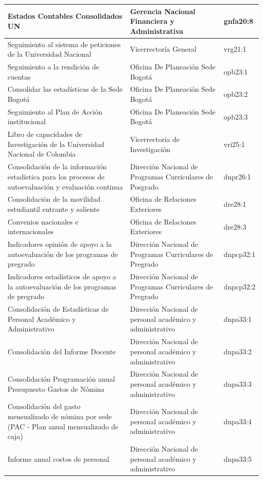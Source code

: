 \documentclass[
]{book}
\begin{document}
\begin{table}
\begin{tabular}[t]{l|l|l}
\hline
Estados Contables Consolidados UN & Gerencia Nacional Financiera y Administrativa & gnfa20:8\\
\hline
Seguimiento al sistema de peticiones de la Universidad Nacional & Vicerrectoría General & vrg21:1\\
\hline
Seguimiento a la rendición de cuentas & Oficina De Planeación Sede Bogotá & opb23:1\\
\hline
Consolidar las estadísticas de la Sede Bogotá & Oficina De Planeación Sede Bogotá & opb23:2\\
\hline
Seguimiento al Plan de Acción institucional & Oficina De Planeación Sede Bogotá & opb23:3\\
\hline
Libro de capacidades de Investigación de la Universidad Nacional de Colombia & Vicerrectoría de Investigación & vri25:1\\
\hline
Consolidación de la información estadística para los procesos de autoevaluación y evaluación continua & Dirección Nacional de Programas Curriculares de Posgrado & dnpr26:1\\
\hline
Consolidación de la movilidad estudiantil entrante y saliente & Oficina de Relaciones Exteriores & dre28:1\\
\hline
Convenios nacionales e internacionales & Oficina de Relaciones Exteriores & dre28:3\\
\hline
Indicadores opinión de apoyo a la autoevaluación de los programas de pregrado & Dirección Nacional de Programas Curriculares de Pregrado & dnpcp32:1\\
\hline
Indicadores estadísticos de apoyo a la autoevaluación de los programas de pregrado & Dirección Nacional de Programas Curriculares de Pregrado & dnpcp32:2\\
\hline
Consolidación de Estadísticas de Personal Académico y Administrativo & Dirección Nacional de personal académico y administrativo & dnpa33:1\\
\hline
Consolidación del Informe Docente & Dirección Nacional de personal académico y administrativo & dnpa33:2\\
\hline
Consolidación Programación anual Presupuesto Gastos de Nómina & Dirección Nacional de personal académico y administrativo & dnpa33:3\\
\hline
Consolidación del gasto mensualizado de nómina por sede (PAC - Plan anual mensualizado de caja) & Dirección Nacional de personal académico y administrativo & dnpa33:4\\
\hline
Informe anual costos de personal & Dirección Nacional de personal académico y administrativo & dnpa33:5\\

\end{tabular}
\end{table}
\end{document}
